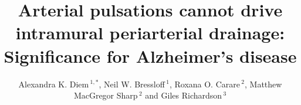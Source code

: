 \documentclass{frontiersFPHY} %
\def\firstAuthorLast{Diem {et~al.}} %
\def\Authors{Alexandra K. Diem\,$^{1,*}$, Neil W. Bressloff\,$^{1}$, Roxana O. Carare\,$^{2}$, Matthew MacGregor Sharp\,$^{2}$ and Giles Richardson\,$^3$}
\begin{document}
\onecolumn
{}

\title[Arterial pulsations cannot drive periarterial drainage]{Arterial pulsations cannot drive intramural periarterial drainage: Significance for Alzheimer's disease} 

\author[\firstAuthorLast ]{\Authors} %
\address{} %
\correspondance{} %

\extraAuth{}%


\maketitle

\end{document}
